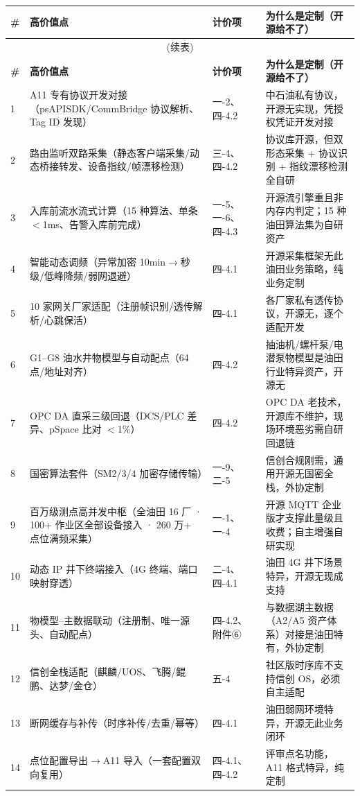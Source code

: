 \documentclass[11pt,a4paper]{ctexart}
\begin{document}
\begin{longtable}{p{0.8cm} p{4.2cm} p{2.6cm} p{6.2cm}}
\toprule
\textbf{\#} & \textbf{高价值点} & \textbf{计价项} & \textbf{为什么是定制（开源给不了）} \\
\midrule
\endfirsthead
\multicolumn{4}{c}{(续表)} \\
\toprule
\textbf{\#} & \textbf{高价值点} & \textbf{计价项} & \textbf{为什么是定制（开源给不了）} \\
\midrule
\endhead

1 & A11 专有协议开发对接（psAPISDK/\allowbreak{}CommBridge 协议解析、Tag ID 发现） & 一-2、四-4.2 & 中石油私有协议，开源无实现，凭授权凭证开发对接 \\
2 & 路由监听双路采集（静态客户端采集/动态桥接转发、设备指纹/帧漂移检测） & 三-4、四-4.2 & 协议库开源，但双形态采集 + 协议识别 + 指纹漂移检测全自研 \\
3 & 入库前流水流式计算（15 种算法、单条 $<$1ms、告警入库前完成） & 一-5、一-6、四-4.3 & 开源流引擎重且非内存内判定；15 种油田算法集为自研资产 \\
4 & 智能动态调频（异常加密 10min$\rightarrow$秒级/低峰降频/弱网退避） & 四-4.1 & 开源采集框架无此油田业务策略，纯业务定制 \\
5 & 10 家网关厂家适配（注册帧识别/透传解析/心跳保活） & 四-4.1 & 各厂家私有透传协议，开源无，逐个适配开发 \\
6 & G1--G8 油水井物模型与自动配点（64 点/地址对齐） & 四-4.2 & 抽油机/螺杆泵/电潜泵物模型是油田行业特异资产，开源无 \\
7 & OPC DA 直采三级回退（DCS/PLC 差异、pSpace 比对 $<$1\%） & 四-4.2 & OPC DA 老技术，开源库不维护，现场环境恶劣需自研回退链 \\
8 & 国密算法套件（SM2/3/4 加密存储传输） & 一-9、二-5 & 信创合规刚需，通用开源无国密全栈，外协定制 \\
9 & 百万级测点高并发中枢（全油田 16 厂 · 100+ 作业区全部设备接入 · 260 万+ 点位满频采集） & 一-1、一-4 & 开源 MQTT 企业版才支撑此量级且收费；自主增强自研实现 \\
10 & 动态 IP 井下终端接入（4G 终端、端口映射穿透） & 二-4、四-4.1 & 油田 4G 井下场景特异，开源无现成支持 \\
11 & 物模型--主数据联动（注册制、唯一源头、自动配点） & 四-4.2、附件⑥ & 与数据湖主数据（A2/A5 资产体系）对接是油田特有，外协定制 \\
12 & 信创全栈适配（麒麟/UOS、飞腾/鲲鹏、达梦/金仓） & 五-4 & 社区版时序库不支持信创 OS，必须自主适配 \\
13 & 断网缓存与补传（时序补传/去重/幂等） & 四-4.1 & 油田弱网环境特异，开源无此业务闭环 \\
14 & 点位配置导出$\rightarrow$A11 导入（一套配置双向复用） & 四-4.1、四-4.2 & 评审点名功能，A11 格式特异，纯定制 \\
\bottomrule
\end{longtable}
\end{document}
